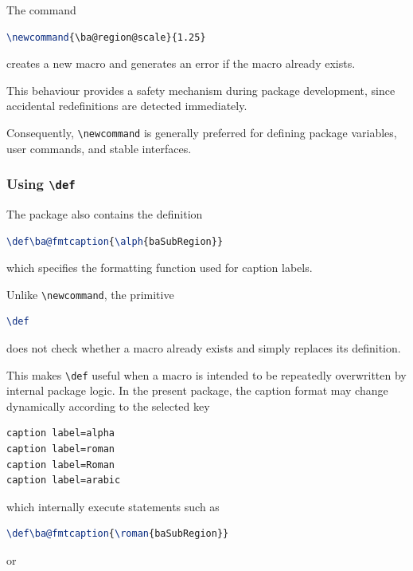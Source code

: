 The command

\begin{lstlisting}[language={LaTeX}]
\newcommand{\ba@region@scale}{1.25}
\end{lstlisting}

creates a new macro and generates an error if the macro already exists.

This behaviour provides a safety mechanism during package development, since accidental redefinitions are detected immediately.

Consequently, \lstinline|\newcommand| is generally preferred for defining package variables, user commands, and stable interfaces.

\subsubsection{Using \texttt{\textbackslash def}}

The package also contains the definition

\begin{lstlisting}[language={LaTeX}]
\def\ba@fmtcaption{\alph{baSubRegion}}
\end{lstlisting}

which specifies the formatting function used for caption labels.

Unlike \lstinline|\newcommand|, the primitive

\begin{lstlisting}[language={LaTeX}]
\def
\end{lstlisting}

does not check whether a macro already exists and simply replaces its definition.

This makes \lstinline|\def| useful when a macro is intended to be repeatedly overwritten by internal package logic. In the present package, the caption format may change dynamically according to the selected key

\begin{lstlisting}[language={LaTeX}]
caption label=alpha
caption label=roman
caption label=Roman
caption label=arabic
\end{lstlisting}

which internally execute statements such as

\begin{lstlisting}[language={LaTeX}]
\def\ba@fmtcaption{\roman{baSubRegion}}
\end{lstlisting}

or

